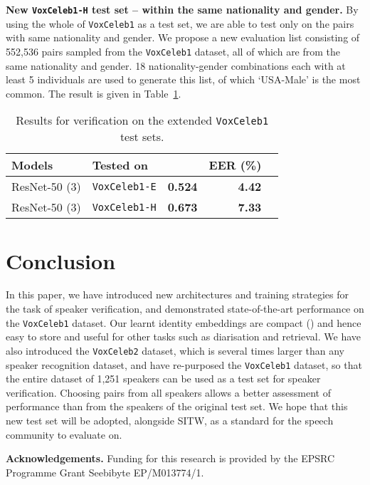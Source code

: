 \documentclass[a4paper]{article}
\def\newpara{\vspace{2pt}}
\def\aftertab{\vspace{-22pt}}
\begin{document}
\newpara\noindent\textbf{New \texttt{VoxCeleb1-H} test set --  within the same nationality and gender.}
By using the whole of \texttt{VoxCeleb1} as a test set,  we are able to test only on the pairs with same nationality and gender. 
We propose a new evaluation list consisting of 552,536 pairs sampled from the 
\texttt{VoxCeleb1} dataset, all of which are from the same nationality
and gender. 18 nationality-gender combinations each with at least 5 individuals are used
to generate this list, of which `USA-Male' is the most common.
The result is given in Table~\ref{table:results_vox1e}.

\begin{table}[h!]
\centering
\footnotesize
\begin{tabular}{ l l c r  r  }

\textbf{Models} & \textbf{Tested on} &  & EER (\%) \\ \hline  
 ResNet-50 (3) 			& \texttt{VoxCeleb1-E} & {\bf 0.524} & {\bf 4.42} \\ 
 ResNet-50 (3) 			& \texttt{VoxCeleb1-H} & {\bf 0.673} & {\bf 7.33} \\ 
\end{tabular} 
\vspace{3pt}

\caption{Results for verification on the extended {\tt VoxCeleb1} test sets.}
\label{table:results_vox1e}
\normalsize
\aftertab
\vspace{-10pt}
\end{table}

\section{Conclusion}


In this paper, we have introduced new architectures and training strategies for the task of speaker verification, and demonstrated state-of-the-art performance on the \texttt{VoxCeleb1} dataset. 
Our learnt identity embeddings are compact () and hence easy to store and useful for other tasks such as diarisation and retrieval.
We have also introduced the \texttt{VoxCeleb2} dataset, which is several times larger than any speaker recognition dataset, and
have re-purposed the \texttt{VoxCeleb1}  dataset, so that the entire dataset 
of 1,251 speakers can be used as
a test set for speaker verification. Choosing pairs from all speakers allows a 
better assessment of performance than from the  speakers of the original test set. We hope that this
new test set will be adopted, alongside SITW, as a standard for the speech community to
evaluate on.


 \newpara\noindent\textbf{Acknowledgements.}
 Funding for this research is provided by the EPSRC 
 Programme Grant Seebibyte EP/M013774/1. 





\end{document}
